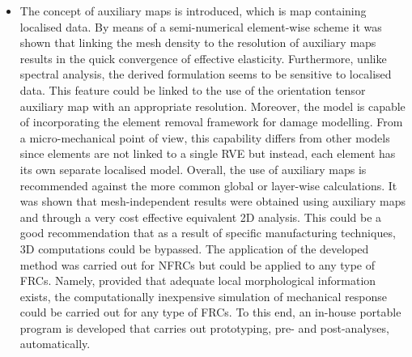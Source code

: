 \begin{enumerate}[label=Stage~\Roman*.]
\begin{itemize}
		\item The concept of auxiliary maps is introduced, which is map containing localised data. By means of a semi-numerical element-wise scheme it was shown that linking the mesh density to the resolution of auxiliary maps results in the quick convergence of effective elasticity. Furthermore, unlike spectral analysis, the derived formulation seems to be sensitive to localised data. This feature could be linked to the use of the orientation tensor auxiliary map with an appropriate resolution. Moreover, the model is capable of incorporating the element removal framework for damage modelling. From a micro-mechanical point of view, this capability differs from other models since elements are not linked to a single RVE but instead, each element has its own separate localised model. Overall, the use of auxiliary maps is recommended against the more common global or layer-wise calculations. It was shown that mesh-independent results were obtained using auxiliary maps and through a very cost effective equivalent 2D analysis. This could be a good recommendation that as a result of specific manufacturing techniques, 3D computations could be bypassed. The application of the developed method was carried out for NFRCs but could be applied to any type of FRCs. Namely, provided that adequate local morphological information exists, the computationally inexpensive simulation of mechanical response could be carried out for any type of FRCs. To this end, an in-house portable program is developed that carries out prototyping, pre- and post-analyses, automatically.
	\end{itemize}
\end{enumerate}
	
